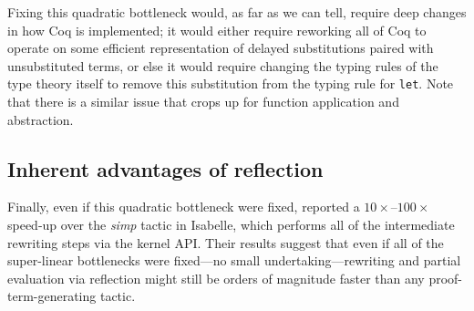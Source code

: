 \begin{subappendices}

Fixing this quadratic bottleneck would, as far as we can tell, require deep changes in how Coq is implemented; it would either require reworking all of Coq to operate on some efficient representation of delayed substitutions paired with unsubstituted terms, or else it would require changing the typing rules of the type theory itself to remove this substitution from the typing rule for \texttt{let}.
Note that there is a similar issue that crops up for function application and abstraction.

\subsection{Inherent advantages of reflection}

Finally, even if this quadratic bottleneck were fixed, \textcite{Aehlig} reported a $10\times$--$100\times$ speed-up over the \emph{simp} tactic in Isabelle, which performs all of the intermediate rewriting steps via the kernel API.
Their results suggest that even if all of the super-linear bottlenecks were fixed---no small undertaking---rewriting and partial evaluation via reflection might still be orders of magnitude faster than any proof-term-generating tactic.



\end{subappendices}
